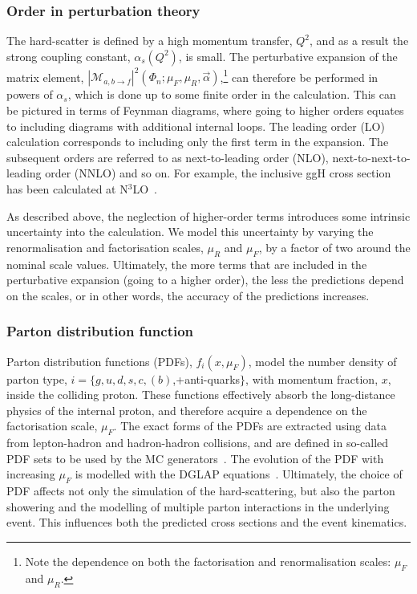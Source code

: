 \subsubsection{Order in perturbation theory}
The hard-scatter is defined by a high momentum transfer, $Q^2$, and as a result the strong coupling constant, $\alpha_s(Q^2)$, is small. The perturbative expansion of the matrix element, $|\mathcal{M}_{a,b\rightarrow f}|^2(\Phi_n;\mu_F,\mu_R,\vec{\alpha})$,\footnote{Note the dependence on both the factorisation and renormalisation scales: $\mu_F$ and $\mu_R$.} can therefore be performed in powers of $\alpha_s$, which is done up to some finite order in the calculation. This can be pictured in terms of Feynman diagrams,
where going to higher orders equates to including diagrams with additional internal loops. The leading order (LO) calculation corresponds to including only the first term in the expansion. The subsequent orders are referred to as next-to-leading order (NLO), next-to-next-to-leading order (NNLO) and so on. For example, the inclusive ggH cross section has been calculated at N$^{3}$LO~\cite{Anastasiou:2016cez}.

As described above, the neglection of higher-order terms introduces some intrinsic uncertainty into the calculation. We model this uncertainty by varying the renormalisation and factorisation scales, $\mu_R$ and $\mu_F$, by a factor of two around the nominal scale values.
Ultimately, the more terms that are included in the perturbative expansion (going to a higher order), the less the predictions depend on the scales, or in other words, the accuracy of the predictions increases.

\subsubsection{Parton distribution function}
Parton distribution functions (PDFs), $f_{i}(x,\mu_F)$, model the number density of parton type, $i=\{g,u,d,s,c,(b)$,+anti-quarks$\}$, with momentum fraction, $x$, inside the colliding proton. These functions effectively absorb the long-distance physics of the internal proton, and therefore acquire a dependence on the factorisation scale, $\mu_F$. The exact forms of the PDFs are extracted using data from lepton-hadron and hadron-hadron collisions, and are defined in so-called PDF sets to be used by the MC generators~\cite{Butterworth:2015oua}. The evolution of the PDF with increasing $\mu_F$ is modelled with the DGLAP equations~\cite{Gribov:1972ri,Dokshitzer:1977sg,Altarelli:1977zs}. Ultimately, the choice of PDF affects not only the simulation of the hard-scattering, but also the parton showering and the modelling of multiple parton interactions in the underlying event. This influences both the predicted cross sections and the event kinematics.

